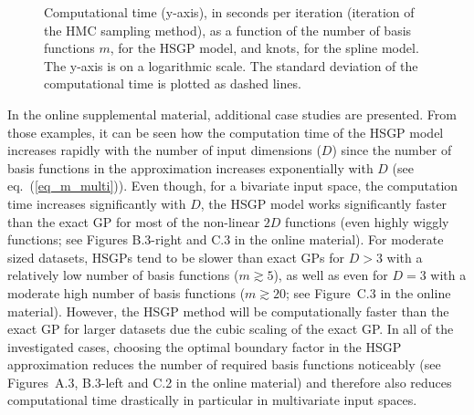\documentclass[onecolumn,a4paper,11pt]{article}
\begin{document}
\begin{figure}
\centering
{}
\caption{Computational time (y-axis), in seconds per iteration (iteration of the HMC sampling method), as a function of the number of basis functions $m$, for the HSGP model, and knots, for the spline model. The y-axis is on a logarithmic scale. The standard deviation of the computational time is plotted as dashed lines.}
  \label{ch5_fig11_time_exI}
\end{figure}

In the online supplemental material, additional case studies are presented. From those examples, it can be seen how the computation time of the HSGP model increases rapidly with the number of input dimensions ($D$) since the number of basis functions in the approximation increases exponentially with $D$ (see eq.~(\ref{eq_m_multi})). Even though, for a bivariate input space, the computation time increases significantly with $D$, the HSGP model works significantly faster than the exact GP for most of the non-linear $2D$ functions (even highly wiggly functions; see Figures B.3-right and C.3 in the online material). For moderate sized datasets, HSGPs tend to be slower than exact GPs for $D>3$ with a relatively low number of basis functions ($m \gtrsim 5$), as well as even for $D=3$ with a moderate high number of basis functions ($m \gtrsim 20$; see Figure~C.3 in the online material). However, the HSGP method will be computationally faster than the exact GP for larger datasets due the cubic scaling of the exact GP. In all of the investigated cases, choosing the optimal boundary factor in the HSGP approximation reduces the number of required basis functions noticeably (see Figures~A.3, B.3-left and C.2 in the online material) and therefore also reduces computational time drastically in particular in multivariate input spaces.
\end{document}
